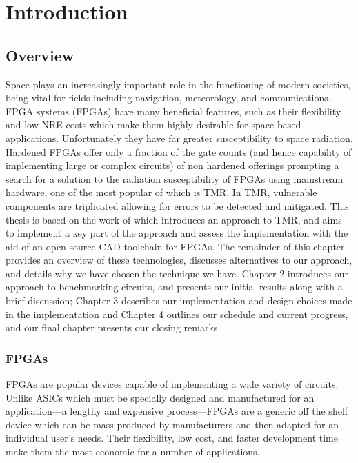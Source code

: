 \documentclass[12pt,final,oneside]{dwThesis} %
\begin{document}
   \chapter{Introduction}
   \section{Overview}
   Space plays an increasingly important role in the functioning of modern societies, being vital for fields including navigation, meteorology, and communications\cite{OECDSpace}. \acl{FPGA} systems (\acsp{FPGA}) have many beneficial features, such as their flexibility and low \ac{NRE} costs which make them highly desirable for space based applications. Unfortunately they have far greater susceptibility to space radiation. Hardened \acp{FPGA} offer only a fraction of the gate counts (and hence capability of implementing large or complex circuits) of non hardened offerings prompting a search for a solution to the radiation susceptibility of \acp{FPGA} using mainstream hardware\cite{VFPGATMR}, one of the most popular of which is \ac{TMR}. In \ac{TMR}, vulnerable components are triplicated allowing for errors to be detected and mitigated. This thesis is based on the work of\cite{DiesselChange} which introduces an approach to \ac{TMR}, and aims to implement a key part of the approach and assess the implementation with the aid of an open source \ac{CAD} toolchain for \acp{FPGA}.
   The remainder of this chapter provides an overview of these technologies, discusses alternatives to our approach, and details why we have chosen the technique we have. Chapter 2 introduces our approach to benchmarking circuits, and presents our initial results along with a brief discussion; Chapter 3 describes our implementation and design choices made in the implementation and Chapter 4 outlines our schedule and current progress, and our final chapter presents our closing remarks.
   \acresetall
   \subsection{\acsp{FPGA}}
   \acp{FPGA} are popular devices capable of implementing a wide variety of circuits. Unlike \acp{ASIC} which must be specially designed and manufactured for an application---a lengthy and expensive process---\acp{FPGA} are a generic off the shelf device which can be mass produced by manufacturers and then adapted for an individual user's needs. Their flexibility, low cost, and faster development time make them the most economic for a number of applications.
\end{document}
